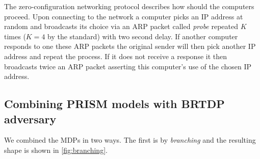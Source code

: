 The zero-configuration networking protocol describes how should the
computers proceed. Upon connecting to the network a computer picks an IP
address at random and broadcasts its choice via an ARP packet called
{\em probe} repeated $K$ times ($K=4$ by the standard) with two second
delay. If another computer responds to one these
ARP packets the original sender will then pick another IP address and
repeat the process. If it does not receive a response it then broadcasts
twice an ARP packet asserting this computer's use of the chosen IP
address.






\subsection*{Combining PRISM models with BRTDP adversary}

We combined the MDPs in two ways. The first is by {\em branching} and the
resulting shape is shown in \autoref{fig:branching}.

